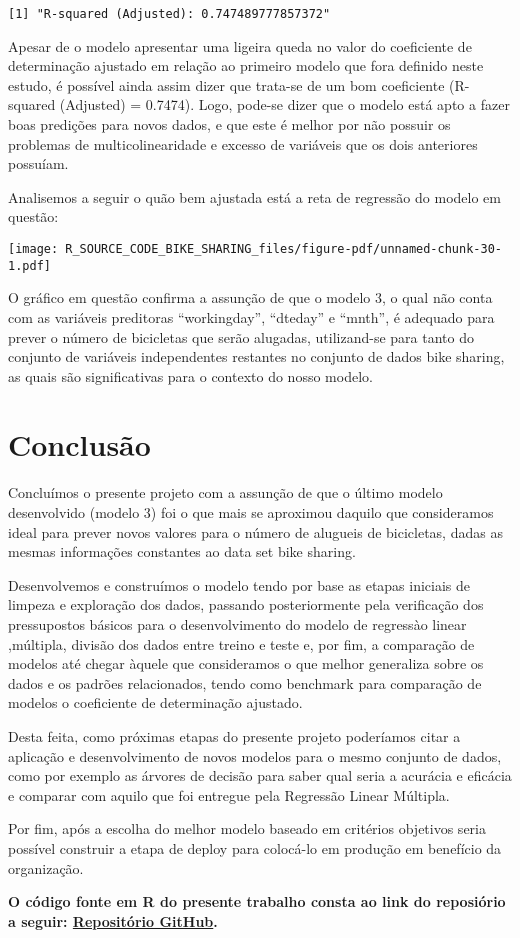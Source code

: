 \documentclass[
  letterpaper,
  DIV=11,
  numbers=noendperiod]{scrartcl}
\begin{document}
\begin{verbatim}
[1] "R-squared (Adjusted): 0.747489777857372"
\end{verbatim}

Apesar de o modelo apresentar uma ligeira queda no valor do coeficiente
de determinação ajustado em relação ao primeiro modelo que fora definido
neste estudo, é possível ainda assim dizer que trata-se de um bom
coeficiente (R-squared (Adjusted) = 0.7474). Logo, pode-se dizer que o
modelo está apto a fazer boas predições para novos dados, e que este é
melhor por não possuir os problemas de multicolinearidade e excesso de
variáveis que os dois anteriores possuíam.

Analisemos a seguir o quão bem ajustada está a reta de regressão do
modelo em questão:

\begin{center}
\texttt{[image: R\_SOURCE\_CODE\_BIKE\_SHARING\_files/figure-pdf/unnamed-chunk-30-1.pdf]}
\end{center}

O gráfico em questão confirma a assunção de que o modelo 3, o qual não
conta com as variáveis preditoras ``workingday'', ``dteday'' e ``mnth'',
é adequado para prever o número de bicicletas que serão alugadas,
utilizand-se para tanto do conjunto de variáveis independentes restantes
no conjunto de dados bike sharing, as quais são significativas para o
contexto do nosso modelo.

\section{Conclusão}\label{conclusuxe3o}

Concluímos o presente projeto com a assunção de que o último modelo
desenvolvido (modelo 3) foi o que mais se aproximou daquilo que
consideramos ideal para prever novos valores para o número de alugueis
de bicicletas, dadas as mesmas informações constantes ao data set bike
sharing.

Desenvolvemos e construímos o modelo tendo por base as etapas iniciais
de limpeza e exploração dos dados, passando posteriormente pela
verificação dos pressupostos básicos para o desenvolvimento do modelo de
regressào linear ,múltipla, divisão dos dados entre treino e teste e,
por fim, a comparação de modelos até chegar àquele que consideramos o
que melhor generaliza sobre os dados e os padrões relacionados, tendo
como benchmark para comparação de modelos o coeficiente de determinação
ajustado.

Desta feita, como próximas etapas do presente projeto poderíamos citar a
aplicação e desenvolvimento de novos modelos para o mesmo conjunto de
dados, como por exemplo as árvores de decisão para saber qual seria a
acurácia e eficácia e comparar com aquilo que foi entregue pela
Regressão Linear Múltipla.

Por fim, após a escolha do melhor modelo baseado em critérios objetivos
seria possível construir a etapa de deploy para colocá-lo em produção em
benefício da organização.

\textbf{O código fonte em R do presente trabalho consta ao link do
reposiório a seguir:
\href{https://github.com/mello-pedro/SUPERV_ML_MCDE_23_24/blob/main/R_SOURCE_CODE_BIKE_SHARING.qmd}{Repositório
GitHub}.}
\end{document}
